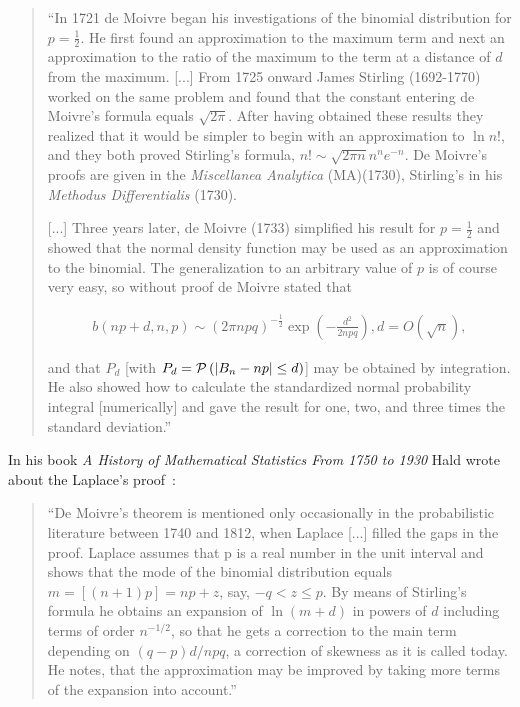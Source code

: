 \begin{quotation}
  ``In 1721 de Moivre began his investigations of the binomial distribution for $p=\tfrac 12$. He first found an approximation to the maximum term and next an approximation to the ratio of the maximum to the term at a distance of $d$ from the maximum. [...] From 1725 onward James Stirling (1692-1770) worked on the same problem and found that the constant entering de Moivre's formula equals $\sqrt{2\pi}$. After having obtained these results they realized that it would be simpler to begin with an approximation to $\ln n!$, and they both proved Stirling's formula, $n! \sim \sqrt{2\pi n}n^ne^{-n}$. De Moivre's proofs are given in the \emph{Miscellanea Analytica} (MA)(1730), Stirling's in his \emph{Methodus Differentialis} (1730).

  [...] Three years later, de Moivre (1733) simplified his result for $p=\tfrac 12$ and showed that the normal density function may be used as an approximation to the binomial. The generalization to an arbitrary value of $p$ is of course very easy, so without proof de Moivre stated that

  \begin{align*}
      b(np+d,n,p) \sim (2\pi npq)^{-\tfrac 12} \exp\left( -\frac{d^2}{2npq} \right), d = O(\sqrt n),
  \end{align*}

  and that $P_d$ [with $P_d=\mathcal P\left({|B_{n} -np|\le d}\right)$] may be obtained by integration. He also showed how to calculate the standardized normal probability integral [numerically] and gave the result for one, two, and three times the standard deviation.''
\end{quotation}


In his book \emph{A History of Mathematical Statistics From 1750 to 1930} Hald wrote about the Laplace's proof~\cite[p. 24]{hald2}:

\begin{quote}
  ``De Moivre's theorem is mentioned only occasionally in the probabilistic literature between 1740 and 1812, when Laplace [...] filled the gaps in the proof. Laplace assumes that p is a real number in the unit interval  and shows that the mode of the binomial distribution equals $m=[(n+1)p]=np+z$, say, $-q < z \le p$. By means of Stirling's formula he obtains an expansion of $\ln(m+d)$ in powers of $d$ including terms of order $n^{-1/2}$, so that he gets a correction to the main term depending on $(q-p)d/npq$, a correction of skewness as it is called today. He notes, that the approximation may be improved by taking more terms of the expansion into account.''
\end{quote}

